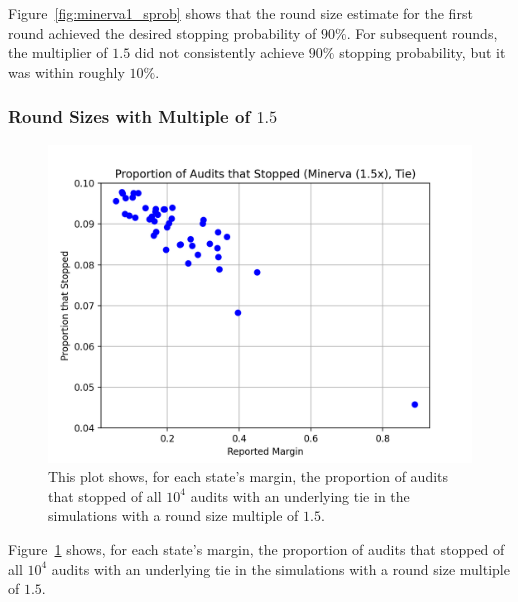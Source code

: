 \documentclass[runningheads]{llncs}
\begin{document}
Figure~\ref{fig:minerva1_sprob} shows that the round size estimate for the first round achieved the desired
stopping probability of $90\%$. For subsequent rounds, the multiplier of $1.5$ did not consistently achieve $90\%$ stopping
probability, but it was within  roughly $10\%$. 

\subsubsection{Round Sizes with Multiple of $1.5$}



\begin{figure}[H]
\includegraphics[width=\textwidth]{minerva_multiround_1p5x_10^4/total_risk.png}
\caption{This plot shows, for each state's margin, the proportion of audits that stopped of
all $10^4$ audits with an underlying tie in the simulations with a round size multiple of $1.5$.}
\label{fig:minerva1p5_risk}
\end{figure}

Figure~\ref{fig:minerva1p5_risk} shows, for each state's margin, the proportion of audits that stopped of
all $10^4$ audits with an underlying tie in the simulations with a round size multiple of $1.5$.
\end{document}
